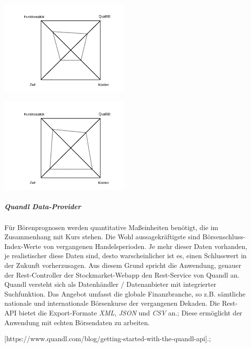 \begin{minipage}[c]{0.5\textwidth}

\includegraphics[width=0.49\textwidth]{mag_viereck_not_linear.png}

\end{minipage}
\begin{minipage}[c]{0.5\textwidth}
\includegraphics[width=0.49\textwidth]{mag_viereck_linear.png}
\end{minipage}

\subparagraph{Quandl Data-Provider}
Für Börenprognosen werden quantitative Maßeinheiten benötigt, die im Zusammenhang mit Kurs stehen. Die Wohl aussagekräftigste sind Börsenschluss-Index-Werte von vergangenen Handelsperioden. Je mehr dieser Daten vorhanden, je realistischer diese Daten sind, desto warscheinlicher ist es, einen Schlusswert in der Zukunft vorherzusagen. 
Aus diesem Grund spricht die Anwendung, genauer der Rest-Controller der Stockmarket-Webapp den Rest-Service von Quandl an.  
Quandl versteht sich als Datenhändler / Datenanbieter mit integrierter Suchfunktion. Das Angebot umfasst die globale Finanzbranche, so z.B. sämtliche nationale und internationale Börsenkurse der vergangenen Dekaden. 
Die Rest-API bietet die Export-Formate \emph{XML}, \emph{JSON} und \emph{CSV} an.\linebreak; 
Diese ermöglicht der Anwendung mit echten Börsendaten zu arbeiten. 

[https://www.quandl.com/blog/getting-started-with-the-quandl-api].\linebreak;

